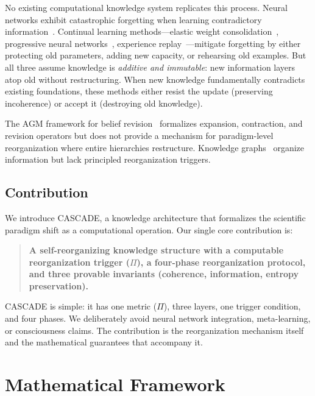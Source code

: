 \documentclass[11pt,a4paper]{article}
\theoremstyle{definition}
\newcommand{\tp}{\Pi}
\begin{document}
No existing computational knowledge system replicates this process. Neural networks exhibit catastrophic forgetting when learning contradictory information~\citep{mccloskey1989catastrophic}. Continual learning methods---elastic weight consolidation~\citep{kirkpatrick2017overcoming}, progressive neural networks~\citep{rusu2016progressive}, experience replay~\citep{chaudhry2019tiny}---mitigate forgetting by either protecting old parameters, adding new capacity, or rehearsing old examples. But all three assume knowledge is \emph{additive and immutable}: new information layers atop old without restructuring. When new knowledge fundamentally contradicts existing foundations, these methods either resist the update (preserving incoherence) or accept it (destroying old knowledge).

The AGM framework for belief revision~\citep{alchourron1985logic} formalizes expansion, contraction, and revision operators but does not provide a mechanism for paradigm-level reorganization where entire hierarchies restructure. Knowledge graphs~\citep{bordes2013translating,speer2017conceptnet} organize information but lack principled reorganization triggers.

\subsection{Contribution}

We introduce CASCADE, a knowledge architecture that formalizes the scientific paradigm shift as a computational operation. Our single core contribution is:

\begin{quote}
\textbf{A self-reorganizing knowledge structure with a computable reorganization trigger ($\tp$), a four-phase reorganization protocol, and three provable invariants (coherence, information, entropy preservation).}
\end{quote}

CASCADE is simple: it has one metric ($\tp$), three layers, one trigger condition, and four phases. We deliberately avoid neural network integration, meta-learning, or consciousness claims. The contribution is the reorganization mechanism itself and the mathematical guarantees that accompany it.

\section{Mathematical Framework}\label{sec:framework}
\end{document}
